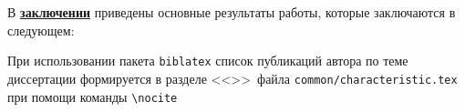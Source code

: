 \FloatBarrier
{}                                  %
В \underline{\textbf{заключении}} приведены основные результаты работы, которые заключаются в следующем:


При использовании пакета \verb!biblatex! список публикаций автора по теме
диссертации формируется в разделе <<\publications>>\ файла
\verb!common/characteristic.tex!  при помощи команды \verb!\nocite!

